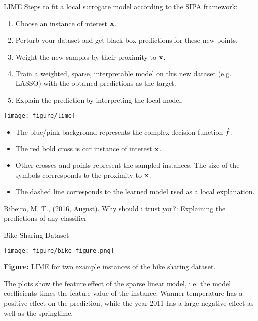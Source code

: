 \documentclass[11pt,compress,t,notes=noshow, xcolor=table]{beamer}
\begin{document}
\begin{vbframe}{LIME}
\normalsize
Steps to fit a local surrogate model according to the SIPA framework:
\begin{enumerate}
  \item Choose an instance of interest $\mathbf{x}$. 
  \item Perturb your dataset and get black box predictions for these new points. 
  \item Weight the new samples by their proximity to $\mathbf{x}$.
  \item Train a weighted, sparse, interpretable model on this new dataset (e.g. LASSO) with the obtained predictions as the target.
  \item Explain the prediction by interpreting the local model. 
\end{enumerate}

\framebreak

\begin{center}
 \texttt{[image: figure/lime]}
\end{center}
\begin{itemize}
  \item The blue/pink background represents the complex decision function $\hat{f}$.
  \item The red bold cross is our instance of interest $\mathbf{x}$.
  \item Other crosses and points represent the sampled instances. The size of the symbols corrresponds to the proximity to $\mathbf{x}$.
  \item The dashed line corresponds to the learned model used as a local explanation.
\end{itemize}
{\tiny{Ribeiro, M. T., (2016, August). Why should i trust you?: Explaining the predictions of any classifier}}
\end{vbframe}

\begin{vbframe}{Bike Sharing Dataset}
\vspace{-.3cm}

\begin{center}
\texttt{[image: figure/bike-figure.png]}
\end{center} 

\footnotesize \textbf{Figure:} LIME for two example instances of the bike sharing dataset.

\normalsize
\vspace{0.2cm}
The plots show the feature effect of the sparse linear model, i.e. the model coefficients times the feature value of the instance.
Warmer temperature has a positive effect on the prediction, 
while the year 2011 has a large negative effect as well as the springtime.
\end{vbframe}
\end{document}
